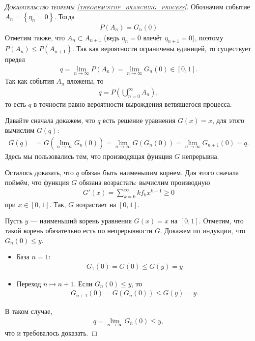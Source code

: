 \documentclass[../main.tex]{subfiles}
\begin{document}
\begin{proof}[\normalfont\textsc{Доказательство теоремы \ref{theorem:stop_branching_process}}]
 Обозначим событие $ A_n = \left\{ \eta_n = 0 \right\} $. Тогда
 \begin{align*}
  P(A_n) = G_n(0)
 \end{align*} Отметим также, что $ A_n \subset A_{n+1} $ (ведь $ \eta_n = 0 $ влечёт $ \eta_{n+1} = 0 $), поэтому $ P(A_n) \leqslant P(A_{n+1}) $. Так как вероятности ограничены единицей, то существует предел
 \begin{align*}
  q = \lim_{n \to \infty} P(A_n) = \lim_{n \to \infty} G_n(0) \in [0,1].
 \end{align*} Так как события $ A_n $ вложены, то
 \begin{align*}
  q = P \left( \bigcup_{n=0}^{\infty} A_n \right),
 \end{align*} то есть $ q $ в точности равно вероятности вырождения ветвящегося процесса.

 Давайте сначала докажем, что $ q $ есть решение уравнения $ G(x) = x $, для этого вычислим $ G(q) $:
 \begin{align*}
  G(q)&=G \left( \lim_{n \to \infty} G_n(0) \right) = \lim_{n \to \infty} G(G_n(0)) = \lim_{n \to \infty} G_{n+1}(0) = q.
 \end{align*} Здесь мы пользовались тем, что производящая функция $ G $ непрерывна.

 Осталось доказать, что $ q $ обязан быть наименьшим корнем. Для этого сначала поймём, что функция $ G $ обязана возрастать: вычислим производную
 \begin{align*}
  G'(x) = \sum_{k=0}^{\infty} k f_k x^{k-1} \geqslant 0
 \end{align*} при $ x \in [0,1] $. Так, $ G $ возрастает на $ [0,1] $.

 Пусть $ y $ --- наименьший корень уравнения $ G(x) = x $ на $ [0,1] $. Отметим, что такой корень обязательно есть по непрерывности $ G  $. Докажем по индукции, что $ G_n(0) \leqslant y $. 
 \begin{itemize}
  \item База $ n=1 $:
   \begin{align*}
    G_1(0) = G(0) \leqslant G(y) = y
   \end{align*}
  \item Переход $ n \mapsto n+1 $. Если $ G_n(0) \leqslant y $, то
   \begin{align*}
    G_{n+1}(0) = G(G_n(0)) \leqslant G(y) = y.
   \end{align*}
 \end{itemize} В таком случае,
 \begin{align*}
  q = \lim_{n \to \infty} G_n(0) \leqslant y,
 \end{align*} что и требовалось доказать.
\end{proof}
\end{document}
